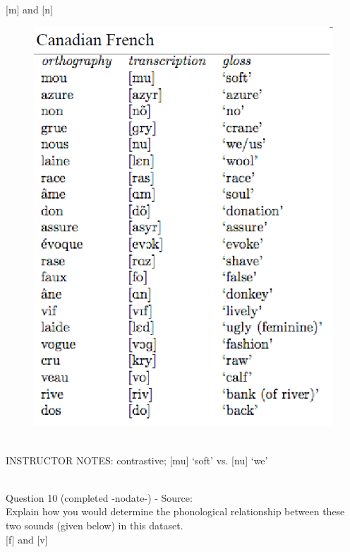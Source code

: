 \documentclass[12pt]{article}
\begin{document}
{[m]} and {[n]}

\begin{figure}[H]
\includegraphics{../images/canadianfrench.png}
\end{figure}

~\\
INSTRUCTOR NOTES: contrastive; [mu] ‘soft’ vs. [nu] ‘we’


~\\

{\large Question 10} (completed -nodate-) - Source: \\

Explain how you would determine the phonological relationship between these two sounds (given below) in this dataset.\\

{[f]} and {[v]}
\end{document}
